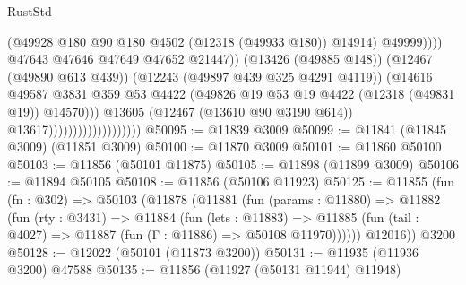 \begin{lexlean}{RustStd}
\begin{coremodule}
                                                        (@49928
                                                          @180
                                                          @90
                                                          @180
                                                          @4502
                                                          (@12318 (@49933 @180))
                                                          @14914)
                                                        @49999))))
                                                @47643
                                                @47646
                                                @47649
                                                @47652
                                                @21447))
                                            (@13426 (@49885 @148))
                                            (@12467 (@49890 @613 @439))
                                            (@12243 (@49897 @439 @325 @4291 @4119))
                                            (@14616
                                              @49587
                                              @3831
                                              @359
                                              @53
                                              @4422
                                              (@49826
                                                @19
                                                @53
                                                @19
                                                @4422
                                                (@12318 (@49831 @19))
                                                @14570)))
                                          @13605
                                          (@12467 (@13610 @90 @3190 @614))
                                          @13617)))))))))))))))))))
@50095 := @11839 @3009
@50099 := @11841 (@11845 @3009) (@11851 @3009)
@50100 := @11870 @3009
@50101 := @11860 @50100
@50103 := @11856 (@50101 @11875)
@50105 := @11898 (@11899 @3009)
@50106 := @11894 @50105
@50108 := @11856 (@50106 @11923)
@50125 := @11855
    (fun (fn : @302) =>
    @50103
      (@11878
        (@11881
          (fun (params : @11880) =>
          @11882
            (fun (rty : @3431) =>
            @11884
              (fun (lets : @11883) =>
              @11885 (fun (tail : @4027) => @11887 (fun (Γ : @11886) => @50108 @11970))))))
        @12016))
    @3200
@50128 := @12022 (@50101 (@11873 @3200))
@50131 := @11935 (@11936 @3200) @47588
@50135 := @11856 (@11927 (@50131 @11944) @11948)

\end{coremodule}
\end{lexlean}
